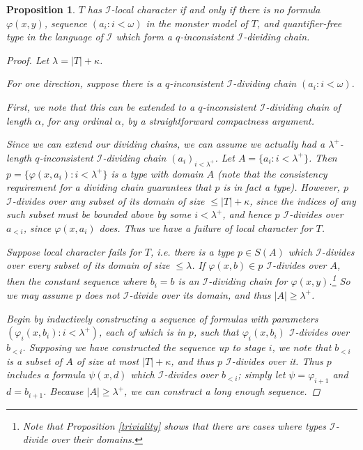 \documentclass{article}
\newcommand{\calI}{\mathcal{I}}
\newcommand{\vphi}{\varphi}
\newtheorem{proposition}{Proposition}
\theoremstyle{definition}
\theoremstyle{definition}
\theoremstyle{definition}
\theoremstyle{definition}
\begin{document}
\begin{proposition}{}
$T$ has $\calI$-local character if and only if there is no formula $\vphi(x,y)$, sequence $(a_i\colon i<\omega)$ in the monster model of $T$, and quantifier-free type in the language of $\calI$ which form a $q$-inconsistent $\calI$-dividing chain. 
\begin{proof}
Let $\lambda=|T|+\kappa$.

For one direction, suppose there is a $q$-inconsistent $\calI$-dividing chain $(a_i\colon i<\omega)$. 

First, we note that this can be extended to a $q$-inconsistent $\calI$-dividing chain of length $\alpha$, for any ordinal $\alpha$, by a straightforward compactness argument.

 Since we can extend our dividing chains, we can assume we actually had a $\lambda^+$-length $q$-inconsistent $\calI$-dividing chain $(a_i)_{i<\lambda^+}$. Let $A=\{a_i\colon i<\lambda^+\}$. Then $p=\{\vphi(x,a_i)\colon i<\lambda^+\}$ is a type with domain $A$ (note that the consistency requirement for a dividing chain guarantees that $p$ is in fact a type). However, $p$ $\calI$-divides over any subset of its domain of size $\leq |T|+\kappa$, since the indices of any such subset must be bounded above by some $i<\lambda^+$, and hence $p$ $\calI$-divides over $a_{<i}$, since $\vphi(x,a_i)$ does. Thus we have a failure of local character for $T$.

Suppose local character fails for $T$, i.e. there is a type $p\in S(A)$ which $\calI$-divides over every subset of its domain of size $\leq \lambda$. If $\vphi(x,b)\in p$ $\calI$-divides over $A$, then the constant sequence where $b_i=b$ is an $\calI$-dividing chain for $\vphi(x,y)$.\footnote{Note that Proposition \ref{triviality} shows that there are cases where types $\calI$-divide over their domains.} So we may assume $p$ does not $\calI$-divide over its domain, and thus $|A|\geq \lambda^+$.

Begin by inductively constructing a sequence of formulas with parameters $(\vphi_i(x,b_i)\colon i<\lambda^+)$, each of which is in $p$, such that $\vphi_i(x,b_i)$ $\calI$-divides over $b_{<i}$. Supposing we have constructed the sequence up to stage $i$, we note that $b_{<i}$ is a subset of $A$ of size at most $|T|+\kappa$, and thus $p$ $\calI$-divides over it. Thus $p$ includes a formula $\psi(x, d)$ which $\calI$-divides over $b_{<i}$; simply let $\psi=\vphi_{i+1}$ and $d=b_{i+1}$. Because $|A|\geq \lambda^+$, we can construct a long enough sequence. 


\end{proof}
\end{proposition}
\end{document}
